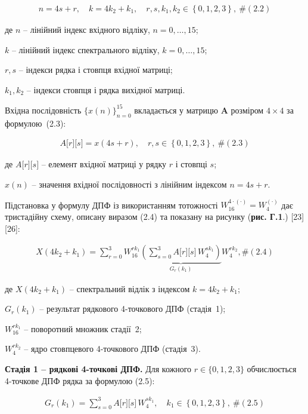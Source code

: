 \documentclass[
]{article}
\begin{document}
\[\begin{array}{r}
n = 4s + r,\quad k = 4k_{2} + k_{1},\quad r,s,k_{1},k_{2} \in \left\{ 0,1,2,3 \right\},\ \#(2.2)
\end{array}\]

де \(n\) -- лінійний індекс вхідного відліку, \(n = 0,\ldots,15\);

\(k\) -- лінійний індекс спектрального відліку, \(k = 0,\ldots,15\);

\(r,s\) -- індекси рядка і стовпця вхідної матриці;

\(k_{1},k_{2}\) -- індекси стовпця і рядка вихідної матриці.

Вхідна послідовність \(\{ x(n)\}_{n = 0}^{15}\) вкладається у матрицю
\(\mathbf{A}\) розміром \(4 \times 4\) за формулою~(2.3):

\[\begin{array}{r}
A\lbrack r\rbrack\lbrack s\rbrack = x(4s + r),\quad r,s \in \left\{ 0,1,2,3 \right\},\ \#(2.3)
\end{array}\]

де \(A\lbrack r\rbrack\lbrack s\rbrack\) -- елемент вхідної матриці у
рядку \(r\) і стовпці \(s\);

\(x(n)\) -- значення вхідної послідовності з лінійним індексом
\(n = 4s + r\).

Підстановка у формулу ДПФ із використанням тотожності
\(W_{16}^{4 \cdot ( \cdot )} = W_{4}^{( \cdot )}\) дає тристадійну
схему, описану виразом (2.4) та показану на рисунку (\textbf{рис. Г.1}.)
{[}23{]}{[}26{]}:

\[\begin{array}{r}
X(4k_{2} + k_{1}) = \sum_{r = 0}^{3}W_{16}^{rk_{1}}\underset{G_{r}(k_{1})}{\underbrace{\left( \sum_{s = 0}^{3}A\lbrack r\rbrack\lbrack s\rbrack\, W_{4}^{sk_{1}} \right)}}W_{4}^{rk_{2}},\#(2.4)
\end{array}\]

де \(X(4k_{2} + k_{1})\) -- спектральний відлік з індексом
\(k = 4k_{2} + k_{1}\);

\(G_{r}(k_{1})\) -- результат рядкового 4-точкового ДПФ (стадія~1);

\(W_{16}^{rk_{1}}\) -- поворотний множник стадії~2;

\(W_{4}^{rk_{2}}\) -- ядро стовпцевого 4-точкового ДПФ (стадія~3).

\textbf{Стадія 1 -- рядкові 4-точкові ДПФ.} Для кожного
\(r \in \{ 0,1,2,3\}\) обчислюється 4-точкове ДПФ рядка за формулою
(2.5):

\[\begin{array}{r}
G_{r}\left( k_{1} \right) = \sum_{s = 0}^{3}A\lbrack r\rbrack\lbrack s\rbrack\, W_{4}^{sk_{1}},\quad k_{1} \in \left\{ 0,1,2,3 \right\},\ \#(2.5)
\end{array}\]
\end{document}
